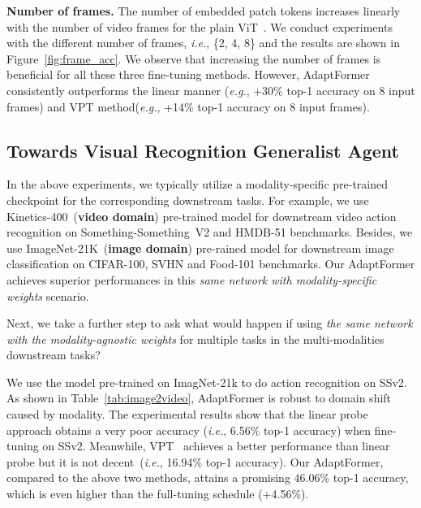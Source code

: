 \textbf{Number of frames.} The number of embedded patch tokens increases linearly with the number of video frames for the plain ViT~\cite{dosovitskiy-2020-vit}. We conduct experiments with the different number of frames, \emph{i.e.}, \{2, 4, 8\} and the results are shown in Figure~\ref{fig:frame_acc}. We observe that increasing the number of frames is beneficial for all these three fine-tuning methods. However, AdaptFormer consistently outperforms the linear manner (\emph{e.g.}, +30\% top-1 accuracy on 8 input frames) and VPT method(\emph{e.g.}, +14\% top-1 accuracy on 8 input frames).

\subsection{Towards Visual Recognition Generalist Agent}

In the above experiments, we typically utilize a modality-specific pre-trained checkpoint for the corresponding downstream tasks. For example, we use \textcolor{Video}{Kinetics-400}~(\textcolor{Video}{\textbf{video domain}}) pre-trained model for downstream video action recognition on \textcolor{Video}{Something-Something~V2} and \textcolor{Video}{HMDB-51} benchmarks. Besides, we use \textcolor{Image}{ImageNet-21K}~(\textcolor{Image}{\textbf{image domain}}) pre-rained model for downstream image classification on \textcolor{Image}{CIFAR-100}, \textcolor{Image}{SVHN} and \textcolor{Image}{Food-101} benchmarks. Our AdaptFormer achieves superior performances in this \emph{same network with modality-specific weights} scenario.

Next, we take a further step to ask what would happen if using \emph{the same network with the modality-agnostic weights} for multiple tasks in the multi-modalities downstream tasks?

We use the model pre-trained on \textcolor{Image}{ImagNet-21k} to do action recognition on \textcolor{Video}{SSv2}. As shown in Table~\ref{tab:image2video}, AdaptFormer is robust to domain shift caused by modality. The experimental results show that the linear probe approach obtains a very poor accuracy (\emph{i.e.}, 6.56\% top-1 accuracy) when fine-tuning on \textcolor{Video}{SSv2}. Meanwhile, VPT~\cite{jia-2022-vpt} achieves a better performance than linear probe but it is not decent~(\emph{i.e.}, 16.94\% top-1 accuracy). Our AdaptFormer, compared to the above two methods, attains a promising 46.06\% top-1 accuracy, which is even higher than the full-tuning schedule (+4.56\%). 

